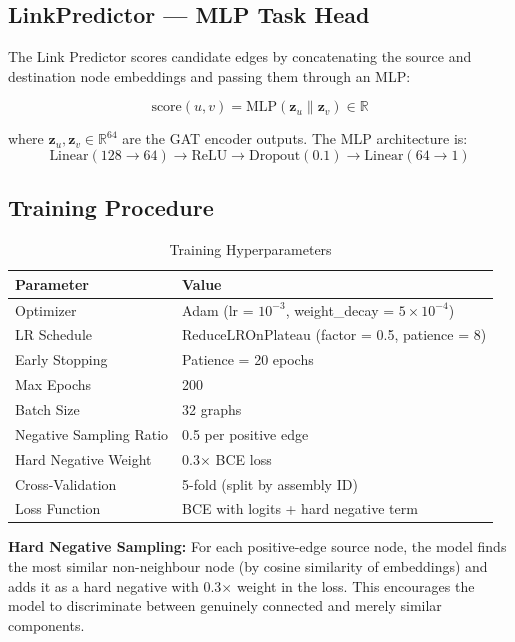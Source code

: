 \documentclass[12pt]{report}
\begin{document}
\subsection{LinkPredictor --- MLP Task Head}

The Link Predictor scores candidate edges by concatenating the source and destination node embeddings and passing them through an MLP:

\begin{equation}
\text{score}(u, v) = \text{MLP}(\mathbf{z}_u \| \mathbf{z}_v) \in \mathbb{R}
\end{equation}

where $\mathbf{z}_u, \mathbf{z}_v \in \mathbb{R}^{64}$ are the GAT encoder outputs. The MLP architecture is:
\[
\text{Linear}(128 \to 64) \to \text{ReLU} \to \text{Dropout}(0.1) \to \text{Linear}(64 \to 1)
\]

\subsection{Training Procedure}

\begin{table}[H]
\centering
\caption{Training Hyperparameters}
\begin{tabular}{l l}
\toprule
\textbf{Parameter} & \textbf{Value} \\
\midrule
Optimizer & Adam (lr = $10^{-3}$, weight\_decay = $5 \times 10^{-4}$) \\
LR Schedule & ReduceLROnPlateau (factor = 0.5, patience = 8) \\
Early Stopping & Patience = 20 epochs \\
Max Epochs & 200 \\
Batch Size & 32 graphs \\
Negative Sampling Ratio & 0.5 per positive edge \\
Hard Negative Weight & 0.3$\times$ BCE loss \\
Cross-Validation & 5-fold (split by assembly ID) \\
Loss Function & BCE with logits + hard negative term \\
\bottomrule
\end{tabular}
\end{table}

\textbf{Hard Negative Sampling:} For each positive-edge source node, the model finds the most similar non-neighbour node (by cosine similarity of embeddings) and adds it as a hard negative with 0.3$\times$ weight in the loss. This encourages the model to discriminate between genuinely connected and merely similar components.
\end{document}
